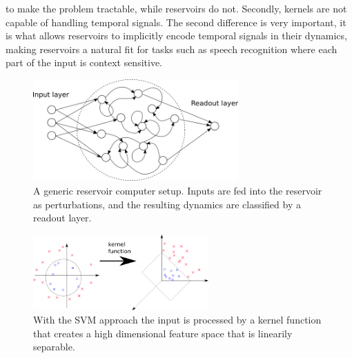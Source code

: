 to make the problem tractable, while reservoirs do not.
Secondly, kernels are not capable of handling temporal signals.
The second difference is very important, it is what allows reservoirs to
implicitly encode temporal signals in their dynamics, making reservoirs a
natural fit for tasks such as speech recognition where each part of the input is
context sensitive.
\begin{figure}[h!]
  \centering
  \includegraphics[width=0.7\textwidth]{fig/reservoirz.png}
  \caption{
    A generic reservoir computer setup. Inputs are fed into the reservoir as
    perturbations, and the resulting dynamics are classified by a readout layer.
  }
  \label{figRC}
\end{figure}
\begin{figure}[h!]
  \centering
  \includegraphics[width=0.6\textwidth]{fig/svmthing.png}
  \caption{
    With the SVM approach the input is processed by a kernel function that
    creates a high dimensional feature space that is linearily separable.
  }
  \label{figSVM}
\end{figure}

